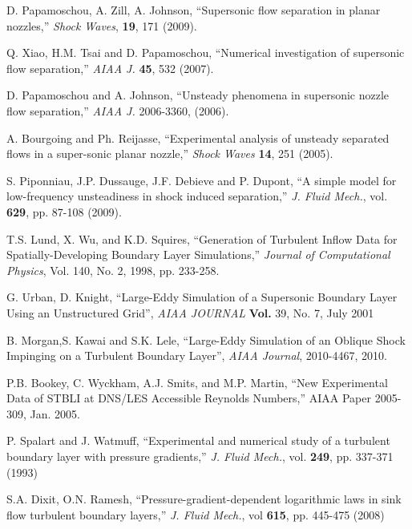 \documentclass[]{aiaa-tc}%
\begin{document}
\begin{thebibliography}{10}
 	D. Papamoschou, A. Zill, A. Johnson, ``Supersonic flow separation in planar nozzles,'' \emph{Shock Waves}, {\bf 19}, 171 (2009).

 	Q. Xiao, H.M. Tsai and D. Papamoschou, ``Numerical investigation of supersonic flow separation,'' \emph{AIAA J.} {\bf 45}, 532 (2007).
	
 	D. Papamoschou and A. Johnson, ``Unsteady phenomena in supersonic nozzle flow separation,'' \emph{AIAA J.} 2006-3360, (2006).
	
 	A. Bourgoing and Ph. Reijasse, ``Experimental analysis of unsteady separated flows in a super-sonic planar nozzle,'' \emph{Shock Waves} {\bf 14}, 251 (2005).
	
 	S. Piponniau, J.P. Dussauge, J.F. Debieve and P. Dupont, ``A simple model for low-frequency unsteadiness in shock induced separation,'' \emph{J. Fluid Mech.}, vol. {\bf 629}, pp. 87-108 (2009).
	
 	T.S. Lund, X. Wu, and K.D. Squires, ``Generation of Turbulent Inflow Data for Spatially-Developing Boundary Layer 
Simulations,'' \emph{Journal of Computational Physics}, Vol. 140, No. 2, 1998, pp. 233-258.

	G. Urban, D. Knight, ``Large-Eddy Simulation of a Supersonic Boundary Layer Using an Unstructured Grid'', \emph{AIAA JOURNAL} {\bf Vol.} 39, No. 7, July 2001


 	B. Morgan,S. Kawai and S.K. Lele, ``Large-Eddy Simulation of an Oblique Shock Impinging on a 
Turbulent Boundary Layer'', \emph{AIAA Journal}, 2010-4467, 2010.
 	
 	P.B. Bookey, C. Wyckham, A.J. Smits, and M.P. Martin, ``New Experimental Data of STBLI at DNS/LES Accessible 
Reynolds Numbers,''  AIAA Paper 2005-309, Jan. 2005.

	P. Spalart and J. Watmuff, ``Experimental and numerical study of a turbulent boundary layer with pressure gradients,'' \emph{J. Fluid Mech.},
vol. {\bf 249}, pp. 337-371 (1993)	

	S.A. Dixit, O.N. Ramesh, ``Pressure-gradient-dependent logarithmic laws in sink flow turbulent boundary layers,'' \emph{J. Fluid Mech.}, vol {\bf 615}, pp. 445-475 (2008)

 
	
\end{thebibliography}
\end{document}
